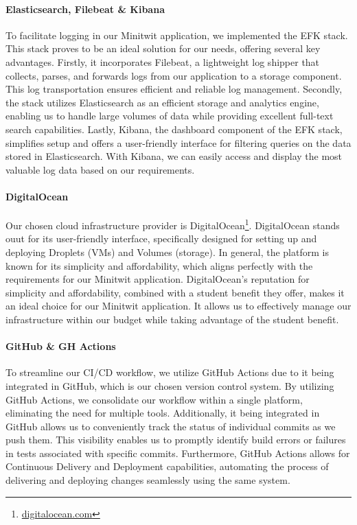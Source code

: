 \paragraph*{Elasticsearch, Filebeat \& Kibana}
To facilitate logging in our Minitwit application, we implemented the EFK stack. This stack proves to be an ideal solution for our needs, offering several key advantages. Firstly, it incorporates Filebeat, a lightweight log shipper that collects, parses, and forwards logs from our application to a storage component. This log transportation ensures efficient and reliable log management. Secondly, the stack utilizes Elasticsearch as an efficient storage and analytics engine, enabling us to handle large volumes of data while providing excellent full-text search capabilities. Lastly, Kibana, the dashboard component of the EFK stack, simplifies setup and offers a user-friendly interface for filtering queries on the data stored in Elasticsearch. With Kibana, we can easily access and display the most valuable log data based on our requirements. 

\paragraph*{DigitalOcean}
Our chosen cloud infrastructure provider is DigitalOcean\footnote{\href{https://www.digitalocean.com/}{digitalocean.com}}. DigitalOcean stands ouut for its user-friendly interface, specifically designed for setting up and deploying Droplets (VMs) and Volumes (storage). In general, the platform is known for its simplicity and affordability, which aligns perfectly with the requirements for our Minitwit application. DigitalOcean's reputation for simplicity and affordability, combined with a student benefit they offer, makes it an ideal choice for our Minitwit application. It allows us to effectively manage our infrastructure within our budget while taking advantage of the student benefit.

\paragraph*{GitHub \& GH Actions}
To streamline our CI/CD workflow, we utilize GitHub Actions due to it being integrated in GitHub, which is our chosen version control system. By utilizing GitHub Actions, we consolidate our workflow within a single platform, eliminating the need for multiple tools. Additionally, it being integrated in GitHub allows us to conveniently track the status of individual commits as we push them. This visibility enables us to promptly identify build errors or failures in tests associated with specific commits. Furthermore, GitHub Actions allows for Continuous Delivery and Deployment capabilities, automating the process of delivering and deploying changes seamlessly using the same system.

